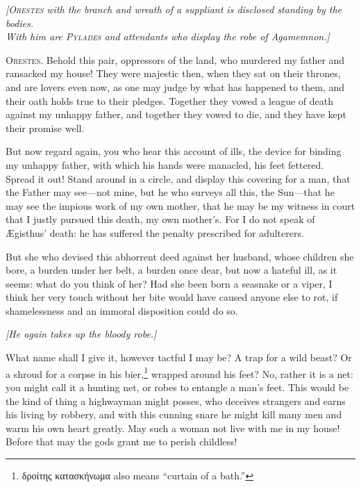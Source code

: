 \documentclass[12pt]{article}
\begin{document}
\begin{center}
\textit{[\textsc{Orestes} with the branch and wreath of a suppliant is disclosed standing by the bodies.\\
With him are \textsc{Pylades} and attendants who display the robe of Agamemnon.]}
\end{center}

\textsc{Orestes.} Behold this pair, oppressors of the land, who murdered my father and ransacked my house! They were majestic then, when they sat on their thrones, and are lovers even now, as one may judge by what has happened to them, and their oath holds true to their pledges. Together they vowed a league of death against my unhappy father, and together they vowed to die, and they have kept their promise well.

But now regard again, you who hear this account of ills, the device for binding my unhappy father, with which his hands were manacled, his feet fettered. Spread it out! Stand around in a circle, and display this covering for a man, that the Father may see---not mine, but he who surveys all this, the Sun---that he may see the impious work of my own mother, that he may be my witness in court that I justly pursued this death, my own mother's. For I do not speak of {\AE}gisthus' death: he has suffered the penalty prescribed for adulterers.

But she who devised this abhorrent deed against her husband, whose children she bore, a burden under her belt, a burden once dear, but now a hateful ill, as it seems: what do you think of her? Had she been born a seasnake or a viper, I think her very touch without her bite would have caused anyone else to rot, if shamelessness and an immoral disposition could do so.

\begin{center}
\textit{[He again takes up the bloody robe.]}
\end{center}

What name shall I give it, however tactful I may be? A trap for a wild beast? Or a shroud for a corpse in his bier,\footnote{δροίτης κατασκήνωμα also means ``curtain of a bath.''} wrapped around his feet? No, rather it is a net: you might call it a hunting net, or robes to entangle a man's feet. This would be the kind of thing a highwayman might posses, who deceives strangers and earns his living by robbery, and with this cunning snare he might kill many men and warm his own heart greatly. May such a woman not live with me in my house! Before that may the gods grant me to perish childless!
\end{document}
